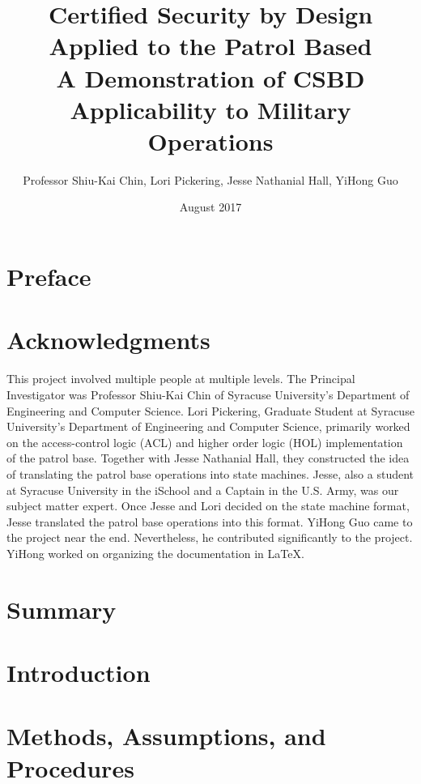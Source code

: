 \documentclass{book}
\title{Certified Security by Design Applied to the Patrol Based\\
  A Demonstration of CSBD Applicability to Military Operations}
\author{Professor Shiu-Kai Chin, Lori Pickering, Jesse Nathanial Hall, YiHong Guo}
\date{August 2017}
\begin{document}
\lstset{language=ML}
\maketitle{}

\tableofcontents{}

\listoffigures

\chapter*{Preface}
\label{cha:preface}


\chapter*{Acknowledgments}
\label{cha:acknowledgments}
  This project involved multiple people at multiple levels. The Principal Investigator was
  Professor Shiu-Kai Chin of Syracuse University’s Department of Engineering and Computer Science.
  Lori Pickering, Graduate Student at Syracuse University’s Department of Engineering and Computer
  Science, primarily worked on the access-control logic (ACL) and higher order logic (HOL)
  implementation of the patrol base. Together with Jesse Nathanial Hall, they constructed the
  idea of translating the patrol base operations into state machines. Jesse, also a student at
  Syracuse University in the iSchool and a Captain in the U.S. Army, was our subject matter expert.
  Once Jesse and Lori decided on the state machine format, Jesse translated the patrol base operations
  into this format. YiHong Guo came to the project near the end. Nevertheless, he contributed significantly
  to the project. YiHong worked on organizing the documentation in LaTeX.

\chapter{Summary}
\label{cha:summary}


\chapter{Introduction}
\label{cha:introduction}


\chapter{Methods, Assumptions, and Procedures}
\label{cha:meth-assumpt-proc}

\end{document}
